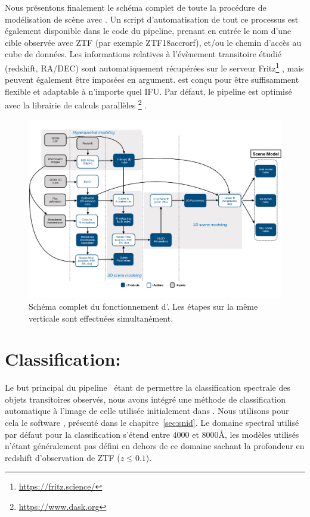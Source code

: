 \documentclass[../main/main.tex]{subfiles}
\begin{document}
Nous présentons finalement le schéma complet de toute la procédure de
modélisation de scène avec \hypergal. Un script d'automatisation de tout
ce processus est également disponible dans le code du pipeline, prenant
en entrée le nom d'une cible observée avec ZTF (par exemple
ZTF18accrorf), et/ou le chemin d'accès au cube de données. Les
informations relatives à l'évènement transitoire étudié (redshift, RA/DEC) sont
automatiquement récupérées sur le serveur
Fritz\footnote{\url{https://fritz.science/}} \citep{skyportal2019,
  duev2019real, Kasliwal_2019, Duev2021}, mais peuvent également être
imposées en argument. \hypergal est conçu pour être suffisamment
flexible et adaptable à n'importe quel IFU.
Par défaut, le pipeline est optimisé avec la librairie de calculs
parallèles \footnote{\url{https://www.dask.org}}
\citep{Dask}.

\begin{landscape}
\begin{figure}
  \centering
  \includegraphics[width=0.99\linewidth]{../figures/07_scene/Fulldaghypergal.pdf}
  \caption{Schéma complet du fonctionnement d'\hypergal. Les étapes sur
    la même verticale sont effectuées simultanément.}
  \label{fig:fulldag}
\end{figure}
\end{landscape}
\section{Classification: }\label{sec:snidclassification}

Le but principal du pipeline \hypergal\ étant de
permettre la classification spectrale des objets transitoires
observés, nous avons intégré une méthode de classification automatique à l'image de celle
utilisée initialement dans . Nous utilisons pour cela le
software , présenté dans le chapitre~\ref{sec:snid}. Le
domaine spectral utilisé par défaut pour la classification s'étend entre
$4000$ et $8000$\AA, les modèles utilisés n'étant généralement pas
défini en dehors de ce domaine sachant la profondeur en redshift
d'observation de ZTF ($z\leq0.1$). 
\end{document}
